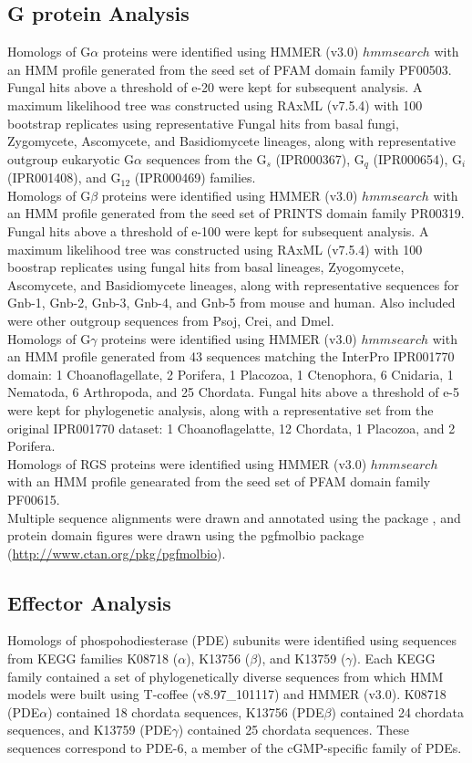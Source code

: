 \subsection*{G protein Analysis}
Homologs of G$\alpha$ proteins were identified using HMMER (v3.0) $hmmsearch$ with an HMM profile generated from the seed set of PFAM domain family PF00503. Fungal hits above a threshold of e-20 were kept for subsequent analysis. A maximum likelihood tree was constructed using RAxML (v7.5.4) with 100 bootstrap replicates using representative Fungal hits from basal fungi, Zygomycete, Ascomycete, and Basidiomycete lineages, along with representative outgroup eukaryotic G$\alpha$ sequences from the G$_{s}$ (IPR000367), G$_{q}$ (IPR000654), G$_{i}$ (IPR001408), and G$_{12}$ (IPR000469) families.\\
\indent Homologs of G$\beta$ proteins were identified using HMMER (v3.0) $hmmsearch$ with an HMM profile generated from the seed set of PRINTS domain family PR00319. Fungal hits above a threshold of e-100 were kept for subsequent analysis. A maximum likelihood tree was constructed using RAxML (v7.5.4) with 100 boostrap replicates using fungal hits from basal lineages, Zyogomycete, Ascomycete, and Basidiomycete lineages, along with representative sequences for Gnb-1, Gnb-2, Gnb-3, Gnb-4, and Gnb-5 from mouse and human. Also included were other outgroup sequences from Psoj, Crei, and Dmel.\\
\indent Homologs of G$\gamma$ proteins were identified using HMMER (v3.0) $hmmsearch$ with an HMM profile generated from 43 sequences matching the InterPro IPR001770 domain: 1 Choanoflagellate, 2 Porifera, 1 Placozoa, 1 Ctenophora, 6 Cnidaria, 1 Nematoda, 6 Arthropoda, and 25 Chordata. Fungal hits above a threshold of e-5 were kept for phylogenetic analysis, along with a representative set from the original IPR001770 dataset: 1 Choanoflagelatte, 12 Chordata, 1 Placozoa, and 2 Porifera. \\
\indent Homologs of RGS proteins were identified using HMMER (v3.0) $hmmsearch$ with an HMM profile genearated from the seed set of PFAM domain family PF00615.\\
\indent Multiple sequence alignments were drawn and annotated using the \TeXshade package \cite{Beitz2000texshade}, and protein domain figures were drawn using the pgfmolbio package (\url{http://www.ctan.org/pkg/pgfmolbio}).\\
\subsection*{Effector Analysis}
\indent Homologs of phospohodiesterase (PDE) subunits were identified using sequences from KEGG families K08718 ($\alpha$), K13756 ($\beta$), and K13759 ($\gamma$). Each KEGG family contained a set of phylogenetically diverse sequences from which HMM models were built using T-coffee (v8.97\_101117) and HMMER (v3.0). K08718 (PDE$\alpha$) contained 18 chordata sequences, K13756 (PDE$\beta$) contained 24 chordata sequences, and K13759 (PDE$\gamma$) contained 25 chordata sequences. These sequences correspond to PDE-6, a member of the cGMP-specific  family of PDEs.\\

